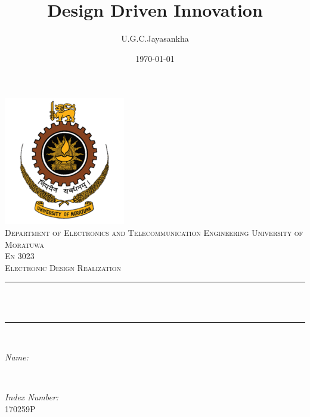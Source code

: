 \documentclass[12pt]{article}
\title{Design Driven Innovation}					%
\author{U.G.C.Jayasankha}								%
\date{\today}											%
\makeatletter
\let\thetitle\@title
\let\theauthor\@author
\let\thedate\@date
\makeatother
\begin{document}

\begin{titlepage}
	\centering
    \vspace*{0.5 cm}
    \includegraphics[scale = 0.8]{University_of_Moratuwa_logo.png}\\[1.0 cm]	%
    \textsc{Department of Electronics and Telecommunication Engineering University of Moratuwa}\\[0.8 cm]
	\textsc{\Large En 3023}\\[0.3 cm]				%
	\textsc{\Large Electronic Design Realization}\\[0.5 cm]				%
	\rule{\linewidth}{0.2 mm} \\[0.4 cm]
	{ \huge \bfseries \thetitle}\\
	\rule{\linewidth}{0.2 mm} \\[1.5 cm]
	
	\begin{minipage}{0.4\textwidth}
		\begin{flushleft} \large
			\emph{Name:}\\
			\theauthor
			\end{flushleft}
			\end{minipage}~
			\begin{minipage}{0.4\textwidth}
			\begin{flushright} \large
			\emph{Index Number:} \\
			170259P									%
		\end{flushright}
	\end{minipage}\\[2 cm]
	
	{\large \thedate}\\[2 cm]
 
	\vfill
	
\end{titlepage}
\end{document}
